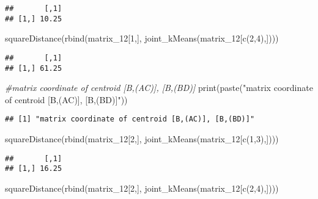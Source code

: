 \documentclass[
]{article}
\newenvironment{Shaded}{\begin{snugshade}}{\end{snugshade}}
\newcommand{\CommentTok}[1]{\textcolor[rgb]{0.56,0.35,0.01}{\textit{#1}}}
\newcommand{\DecValTok}[1]{\textcolor[rgb]{0.00,0.00,0.81}{#1}}
\newcommand{\FunctionTok}[1]{\textcolor[rgb]{0.00,0.00,0.00}{#1}}
\newcommand{\NormalTok}[1]{#1}
\newcommand{\StringTok}[1]{\textcolor[rgb]{0.31,0.60,0.02}{#1}}
\begin{document}
\begin{verbatim}
##       [,1]
## [1,] 10.25
\end{verbatim}

\begin{Shaded}
\begin{Highlighting}[]
\FunctionTok{squareDistance}\NormalTok{(}\FunctionTok{rbind}\NormalTok{(matrix\_12[}\DecValTok{1}\NormalTok{,],}
                     \FunctionTok{joint\_kMeans}\NormalTok{(matrix\_12[}\FunctionTok{c}\NormalTok{(}\DecValTok{2}\NormalTok{,}\DecValTok{4}\NormalTok{),])))}
\end{Highlighting}
\end{Shaded}

\begin{verbatim}
##       [,1]
## [1,] 61.25
\end{verbatim}

\begin{Shaded}
\begin{Highlighting}[]
\CommentTok{\#matrix coordinate of centroid [B,(AC)], [B,(BD)]}
\FunctionTok{print}\NormalTok{(}\FunctionTok{paste}\NormalTok{(}\StringTok{"matrix coordinate of centroid [B,(AC)], [B,(BD)]"}\NormalTok{))}
\end{Highlighting}
\end{Shaded}

\begin{verbatim}
## [1] "matrix coordinate of centroid [B,(AC)], [B,(BD)]"
\end{verbatim}

\begin{Shaded}
\begin{Highlighting}[]
\FunctionTok{squareDistance}\NormalTok{(}\FunctionTok{rbind}\NormalTok{(matrix\_12[}\DecValTok{2}\NormalTok{,],}
                     \FunctionTok{joint\_kMeans}\NormalTok{(matrix\_12[}\FunctionTok{c}\NormalTok{(}\DecValTok{1}\NormalTok{,}\DecValTok{3}\NormalTok{),])))}
\end{Highlighting}
\end{Shaded}

\begin{verbatim}
##       [,1]
## [1,] 16.25
\end{verbatim}

\begin{Shaded}
\begin{Highlighting}[]
\FunctionTok{squareDistance}\NormalTok{(}\FunctionTok{rbind}\NormalTok{(matrix\_12[}\DecValTok{2}\NormalTok{,],}
                     \FunctionTok{joint\_kMeans}\NormalTok{(matrix\_12[}\FunctionTok{c}\NormalTok{(}\DecValTok{2}\NormalTok{,}\DecValTok{4}\NormalTok{),])))}
\end{Highlighting}
\end{Shaded}
\end{document}
